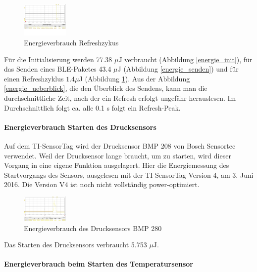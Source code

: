 \newpage
\begin{figure}[ht]
  \includegraphics[width=0.2\textwidth]{3Vorgehen/imag/Refresh.png}
  \caption{Energieverbrauch Refreshzykus}
  \label{energie_refresh}
\end{figure}

Für die Initialisierung werden 77.38 $\mu$J verbraucht (Abbildung \ref{energie_init}), für das Senden eines BLE-Paketes 43.4 $\mu$J (Abbildung \ref{energie_senden}) und für einen Refreshzyklus $1.4\mu$J (Abbildung \ref{energie_refresh}). Aus der Abbildung \ref{energie_ueberblick}, die den Überblick des Sendens, kann man die durchschnittliche Zeit, nach der ein Refresh erfolgt ungefähr herauslesen. Im Durchschnittlich folgt ca. alle 0.1 s folgt ein Refresh-Peak.


\paragraph{Energieverbrauch Starten des Drucksensors}

Auf dem TI-SensorTag wird der Drucksensor BMP 208 von Bosch Sensortec verwendet. Weil der Drucksensor lange  braucht, um zu starten, wird dieser Vorgang in eine eigene Funktion ausgelagert. Hier die Energiemessung des Startvorgangs des Sensors, ausgelesen mit der TI-SensorTag Version 4, am 3. Juni 2016. Die Version V4 ist noch nicht vollständig power-optimiert.

\begin{figure}[ht]
  \includegraphics[width=0.2\textwidth]{3Vorgehen/imag/Drucksensor.png}
  \caption{Energieverbrauch des Drucksensors BMP 280}
  \label{energie_drucksensor}
\end{figure}

Das Starten des Drucksensors verbraucht 5.753 $\mu$J.

\paragraph{Energieverbrauch beim Starten des Temperatursensor}

